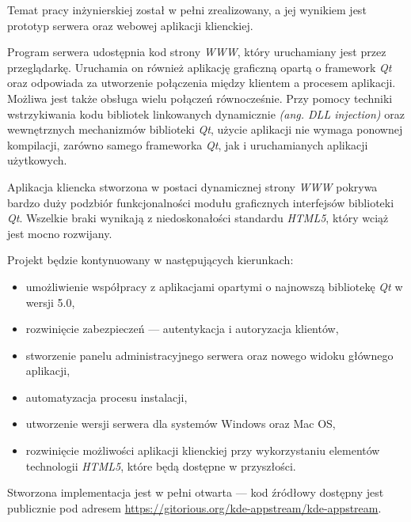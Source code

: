 Temat pracy inżynierskiej został w pełni zrealizowany, a jej wynikiem jest prototyp serwera oraz webowej aplikacji klienckiej. 

Program serwera udostępnia kod strony \emph{WWW}, który uruchamiany jest przez przeglądarkę. Uruchamia on również aplikację graficzną opartą o framework \emph{Qt} oraz odpowiada za utworzenie połączenia między klientem a procesem aplikacji. Możliwa jest także obsługa wielu połączeń równocześnie. 
Przy pomocy techniki wstrzykiwania kodu bibliotek linkowanych dynamicznie \emph{(ang. DLL injection)} oraz wewnętrznych mechanizmów biblioteki \emph{Qt}, użycie aplikacji nie wymaga ponownej kompilacji, zarówno samego frameworka \emph{Qt}, jak i uruchamianych aplikacji użytkowych.

Aplikacja kliencka stworzona w postaci dynamicznej strony \emph{WWW} pokrywa bardzo duży podzbiór funkcjonalności modułu graficznych interfejsów biblioteki \emph{Qt}. Wszelkie braki wynikają z niedoskonałości standardu \emph{HTML5}, który wciąż jest mocno rozwijany.

Projekt będzie kontynuowany w następujących kierunkach:
\begin{itemize}
  \item umożliwienie współpracy z aplikacjami opartymi o najnowszą bibliotekę \emph{Qt} w wersji 5.0,
  \item rozwinięcie zabezpieczeń --- autentykacja i autoryzacja klientów,
  \item stworzenie panelu administracyjnego serwera oraz nowego widoku głównego aplikacji,
  \item automatyzacja procesu instalacji,
  \item utworzenie wersji serwera dla systemów Windows oraz Mac OS,
  \item rozwinięcie możliwości aplikacji klienckiej przy wykorzystaniu elementów technologii \emph{HTML5}, które będą dostępne w przyszłości.
\end{itemize}

Stworzona implementacja jest w pełni otwarta --- kod źródłowy dostępny jest publicznie pod adresem \url{https://gitorious.org/kde-appstream/kde-appstream}.